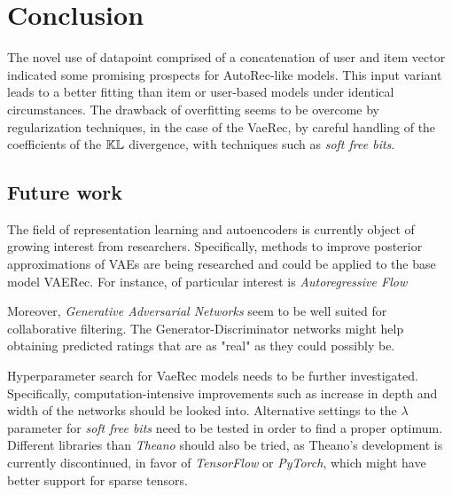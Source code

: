 \chapter{Conclusion}

The novel use of datapoint comprised of a concatenation of user and item vector indicated
some promising prospects for AutoRec-like models. This input variant
leads to a better fitting than item or user-based models under identical circumstances.
The drawback of overfitting seems to be overcome by 
regularization techniques, in the case of the VaeRec, by careful handling of the
coefficients of the $\mathbb{KL}$ divergence, with techniques such as \emph{soft free bits}.


\section{Future work}

The field of representation learning and autoencoders is currently object of
growing interest from researchers. Specifically, methods to improve posterior
approximations of VAEs are being researched and could be applied to the base model
VAERec. For instance, of particular interest is \emph{Autoregressive Flow}
\cite{autoregressive_flow}

Moreover, \emph{Generative Adversarial Networks} \cite{GAN} seem to be well suited 
for collaborative filtering. The Generator-Discriminator networks might help
obtaining predicted ratings that are as "real" as they could possibly be.

Hyperparameter search for VaeRec models needs to be further
investigated. Specifically, computation-intensive improvements
such as increase in depth and width of the networks should be looked into.
Alternative settings to the $\lambda$ parameter for \emph{soft free bits}
need to be tested in order to find a proper optimum.
Different libraries than \emph{Theano}\cite{theano} should also be tried, as Theano's
development is currently discontinued, in favor of \emph{TensorFlow}\cite{tensorflow}
or \emph{PyTorch}\cite{pytorch}, which might have better support for sparse tensors.
